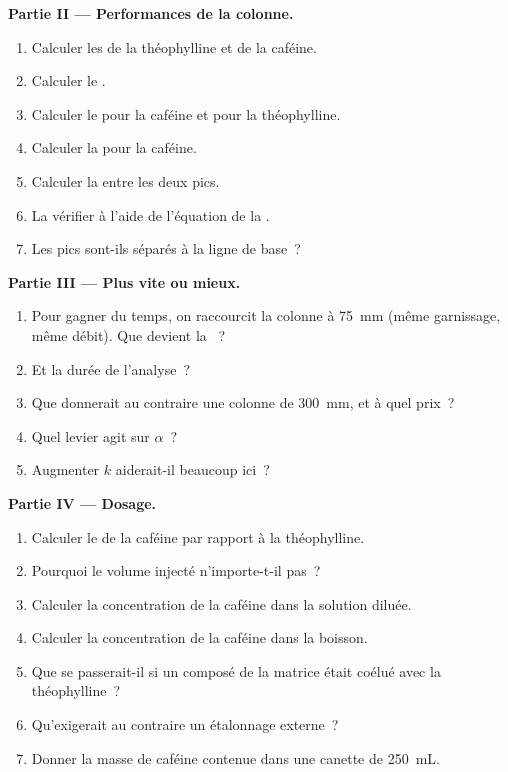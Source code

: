 \begin{problem}
\medskip
\noindent\textbf{Partie II --- Performances de la colonne.}
\begin{enumerate}[resume]
  \item Calculer les  de la théophylline et de la caféine.
  \item Calculer le .
  \item Calculer le  pour la caféine et pour la théophylline.
  \item Calculer la  pour la caféine.
  \item Calculer la  entre les deux pics.
  \item La vérifier à l'aide de l'équation de la .
  \item Les pics sont-ils séparés à la ligne de base~?
\end{enumerate}

\medskip
\noindent\textbf{Partie III --- Plus vite ou mieux.}
\begin{enumerate}[resume]
  \item Pour gagner du temps, on raccourcit la colonne à \qty{75}{mm} (même garnissage, même débit). Que
        devient la ~?
  \item Et la durée de l'analyse~?
  \item Que donnerait au contraire une colonne de \qty{300}{mm}, et à quel prix~?
  \item Quel levier agit sur $\alpha$~?
  \item Augmenter $k$ aiderait-il beaucoup ici~?
\end{enumerate}

\medskip
\noindent\textbf{Partie IV --- Dosage.}
\begin{enumerate}[resume]
  \item Calculer le  de la caféine par rapport à la théophylline.
  \item Pourquoi le volume injecté n'importe-t-il pas~?
  \item Calculer la concentration de la caféine dans la solution diluée.
  \item Calculer la concentration de la caféine dans la boisson.
  \item Que se passerait-il si un composé de la matrice était coélué avec la théophylline~?
  \item Qu'exigerait au contraire un étalonnage externe~?
  \item Donner la masse de caféine contenue dans une canette de \qty{250}{mL}.
\end{enumerate}
\end{problem}
